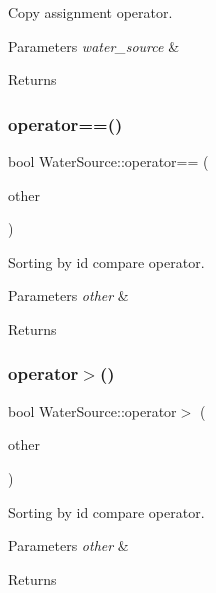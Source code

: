 Copy assignment operator. 
\begin{DoxyParams}{Parameters}
{\em water\+\_\+source} & \\
\hline
\end{DoxyParams}
\begin{DoxyReturn}{Returns}

\end{DoxyReturn}
\mbox{\label{classWaterSource_af25e06ec954898f3392cb125d2f2c2ad}} 
\subsubsection{\texorpdfstring{operator==()}{operator==()}}
{\footnotesize\ttfamily bool Water\+Source\+::operator== (\begin{DoxyParamCaption}\item[{const \mbox{\hyperlink{classWaterSource}{Water\+Source}} $\ast$}]{other }\end{DoxyParamCaption})}

Sorting by id compare operator. 
\begin{DoxyParams}{Parameters}
{\em other} & \\
\hline
\end{DoxyParams}
\begin{DoxyReturn}{Returns}

\end{DoxyReturn}
\mbox{\label{classWaterSource_a9db800769891e1f49d74a78298f4dac1}} 
\subsubsection{\texorpdfstring{operator$>$()}{operator>()}}
{\footnotesize\ttfamily bool Water\+Source\+::operator$>$ (\begin{DoxyParamCaption}\item[{const \mbox{\hyperlink{classWaterSource}{Water\+Source}} $\ast$}]{other }\end{DoxyParamCaption})}

Sorting by id compare operator. 
\begin{DoxyParams}{Parameters}
{\em other} & \\
\hline
\end{DoxyParams}
\begin{DoxyReturn}{Returns}

\end{DoxyReturn}
\mbox{\label{classWaterSource_aebc6985952d3e69f0d8ae1d0498a1ffe}} 
